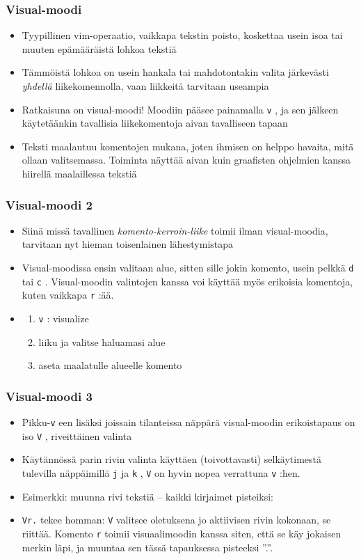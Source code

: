 \documentclass[]{beamer}
\newcommand{\Tohj}[1]{\texttt{#1}}
\newcommand{\com}[1]{{\color{blue!50!black}\Tohj{#1}} \!\!}
\begin{document}
\begin{frame}
    \frametitle{Visual-moodi}
    \begin{itemize}
        \item Tyypillinen vim-operaatio, vaikkapa tekstin poisto, koskettaa usein isoa tai muuten epämääräistä lohkoa tekstiä
        \item Tämmöistä lohkoa on usein hankala tai mahdotontakin valita järkevästi \emph{yhdellä} liikekomennolla, vaan liikkeitä tarvitaan useampia
        \pause
        \item Ratkaisuna on visual-moodi! Moodiin pääsee painamalla \com{v}, ja sen jälkeen käytetäänkin tavallisia liikekomentoja aivan tavalliseen tapaan
        \item Teksti maalautuu komentojen mukana, joten ihmisen on helppo havaita, mitä ollaan valitsemassa. Toiminta näyttää aivan kuin graafisten ohjelmien kanssa hiirellä maalaillessa tekstiä
    \end{itemize}
\end{frame}

\begin{frame}
    \frametitle{Visual-moodi 2}
    \begin{itemize}
        \item Siinä missä tavallinen \emph{komento-kerroin-liike} toimii ilman visual-moodia, tarvitaan nyt hieman toisenlainen lähestymistapa
        \item Visual-moodissa ensin valitaan alue, sitten sille jokin komento, usein pelkkä \com{d} tai \com{c}. Visual-moodin valintojen kanssa voi käyttää myös erikoisia komentoja, kuten vaikkapa \com{r}:ää.
        \pause \item
        \begin{enumerate}
            \item \com{v}: visualize
            \item liiku ja valitse haluamasi alue
            \item aseta maalatulle alueelle komento
        \end{enumerate}
    \end{itemize}
\end{frame}

\begin{frame}
    \frametitle{Visual-moodi 3}
    \begin{itemize}
        \item Pikku-\com{v}een lisäksi joissain tilanteissa näppärä visual-moodin erikoistapaus on iso \com{V}, riveittäinen valinta
        \item Käytännössä parin rivin valinta käyttäen (toivottavasti) selkäytimestä tulevilla näppäimillä \com{j} ja \com{k}, \com{V} on hyvin nopea verrattuna \com{v}:hen.
        \pause
        \item Esimerkki: muunna rivi tekstiä -- kaikki kirjaimet pisteiksi:
        \item \com{Vr.} tekee homman: \com{V} valitsee oletuksena jo aktiivisen rivin kokonaan, se riittää. Komento \com{r} toimii visuaalimoodin kanssa siten, että se käy jokaisen merkin läpi, ja muuntaa sen tässä tapauksessa pisteeksi ''.''.
    \end{itemize}
\end{frame}
\end{document}
